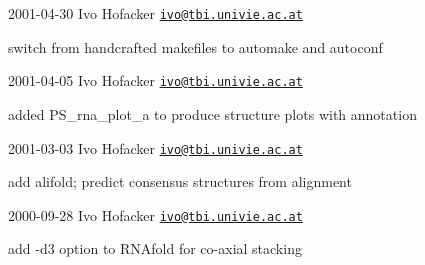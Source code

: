 2001-\/04-\/30 Ivo Hofacker \href{mailto:ivo@tbi.univie.ac.at}{\tt ivo@tbi.\+univie.\+ac.\+at}


\begin{DoxyItemize}
\item switch from handcrafted makefiles to automake and autoconf
\end{DoxyItemize}

2001-\/04-\/05 Ivo Hofacker \href{mailto:ivo@tbi.univie.ac.at}{\tt ivo@tbi.\+univie.\+ac.\+at}


\begin{DoxyItemize}
\item added P\+S\+\_\+rna\+\_\+plot\+\_\+a to produce structure plots with annotation
\end{DoxyItemize}

2001-\/03-\/03 Ivo Hofacker \href{mailto:ivo@tbi.univie.ac.at}{\tt ivo@tbi.\+univie.\+ac.\+at}


\begin{DoxyItemize}
\item add alifold; predict consensus structures from alignment
\end{DoxyItemize}

2000-\/09-\/28 Ivo Hofacker \href{mailto:ivo@tbi.univie.ac.at}{\tt ivo@tbi.\+univie.\+ac.\+at}


\begin{DoxyItemize}
\item add -\/d3 option to R\+N\+Afold for co-\/axial stacking 
\end{DoxyItemize} 